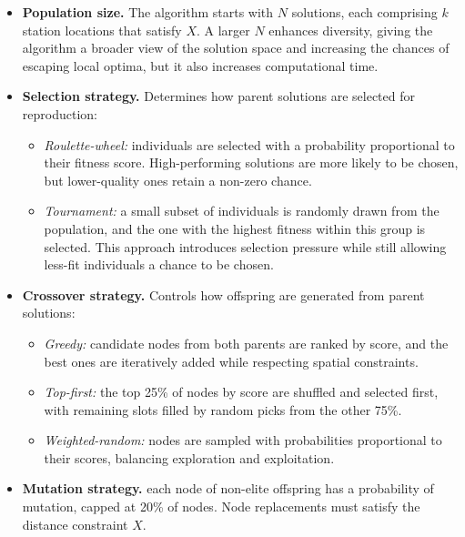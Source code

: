         {%
        \setlength{\parskip}{0.45\parskip}%
        \begin{itemize}
        \item \textbf{Population size.} The algorithm starts with $N$ solutions, each comprising $k$ station locations that satisfy $X$. A larger $N$ enhances diversity, giving the algorithm a broader view of the solution space and increasing the chances of escaping local optima, but it also increases computational time.

        \item \textbf{Selection strategy.} Determines how parent solutions are selected for reproduction:
        
        \begin{itemize}
            \item \textit{Roulette-wheel:} individuals are selected with a probability proportional to their fitness score. High-performing solutions are more likely to be chosen, but lower-quality ones retain a non-zero chance.
            \item \textit{Tournament:} a small subset of individuals is randomly drawn from the population, and the one with the highest fitness within this group is selected.  This approach introduces selection pressure while still allowing less-fit individuals a chance to be chosen.            
        \end{itemize}

        \item \textbf{Crossover strategy.} Controls how offspring are generated from parent solutions: 
        
        \begin{itemize}
            \item \textit{Greedy:} candidate nodes from both parents are ranked by score, and the best ones are iteratively added while respecting spatial constraints. 
            \item \textit{Top-first:} the top 25\% of nodes by score are shuffled and selected first, with remaining slots filled by random picks from the other 75\%.
            \item \textit{Weighted-random:} nodes are sampled with probabilities proportional to their scores, balancing exploration and exploitation. 
        \end{itemize}

        \item \textbf{Mutation strategy.} each node of non-elite offspring has a probability of mutation, capped at 20\% of nodes. Node replacements must satisfy the distance constraint \(X\).


\end{itemize}}
